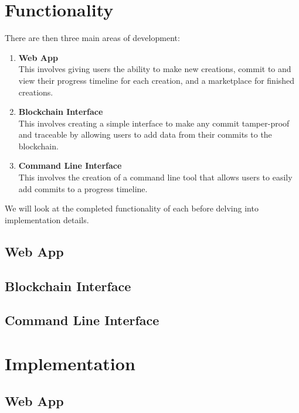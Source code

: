 \documentclass[12pt,a4paper]{article}
\begin{document}
\section{Functionality}
There are then three main areas of development:
\begin{enumerate}
    \item \textbf{Web App} \\This involves giving users the ability to make new creations, commit to and view their progress timeline for each creation, and a marketplace for finished creations.
    \item \textbf{Blockchain Interface} \\This involves creating a simple interface to make any commit tamper-proof and traceable by allowing users to add data from their commits to the blockchain.
    \item \textbf{Command Line Interface} \\This involves the creation of a command line tool that allows users to easily add commits to a progress timeline.
\end{enumerate}
We will look at the completed functionality of each before delving into implementation details.
\subsection{Web App}
\subsection{Blockchain Interface}
\subsection{Command Line Interface}


\section{Implementation}
\subsection{Web App}
\end{document}
